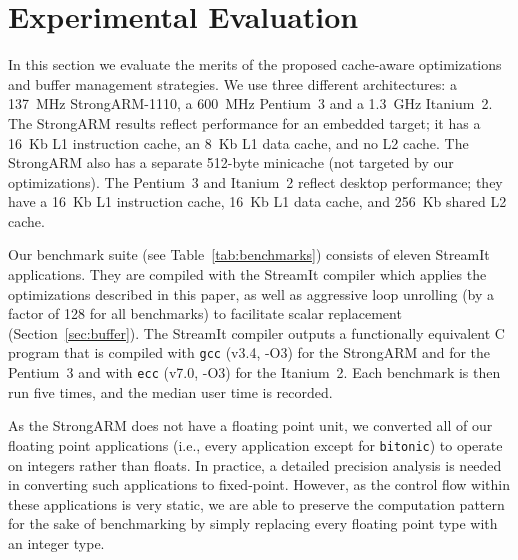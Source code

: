 \section{Experimental Evaluation}
\label{sec:evaluation}

In this section we evaluate the merits of the proposed cache-aware
optimizations and buffer management strategies.  We use three
different architectures: a 137~MHz StrongARM-1110, a 600~MHz Pentium~3
and a 1.3~GHz Itanium~2. The StrongARM results reflect performance for
an embedded target; it has a 16~Kb L1 instruction cache, an 8~Kb L1 data
cache, and no L2 cache.  The StrongARM also has a separate 512-byte
minicache (not targeted by our optimizations).  The Pentium~3 and
Itanium~2 reflect desktop performance; they have a 16~Kb L1 instruction
cache, 16~Kb L1 data cache, and 256~Kb shared L2 cache.

Our benchmark suite (see Table~\ref{tab:benchmarks}) consists of
eleven StreamIt applications. They are compiled with the StreamIt
compiler which applies the optimizations described in this paper, as
well as aggressive loop unrolling (by a factor of 128 for all
benchmarks) to facilitate scalar replacement
(Section~\ref{sec:buffer}).  The StreamIt compiler outputs a
functionally equivalent C program that is compiled with \texttt{gcc}
(v3.4, -O3) for the StrongARM and for the Pentium~3 and with
\texttt{ecc} (v7.0, -O3) for the Itanium~2.  Each benchmark is then
run five times, and the median user time is recorded.

As the StrongARM does not have a floating point unit, we converted all
of our floating point applications (i.e., every application except for
{\tt bitonic}) to operate on integers rather than floats.  In
practice, a detailed precision analysis is needed in converting such
applications to fixed-point.  However, as the control flow within
these applications is very static, we are able to preserve the
computation pattern for the sake of benchmarking by simply replacing
every floating point type with an integer type.

